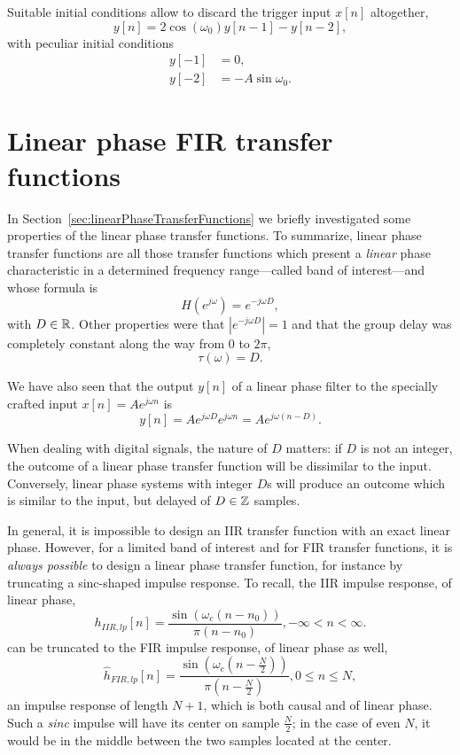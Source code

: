 \documentclass[\documentfontsize, twocolumn]{\classname}
\begin{document}
Suitable initial conditions allow to discard the trigger input $x[n]$ altogether,
\begin{equation}\label{eqn:sinusoidalDigitalOscillatorTriggerInitialConditionsFormula}
    y[n] = 2\cos{(\omega_0)}y[n-1] - y[n-2],
\end{equation}
with peculiar initial conditions
\begin{align}\label{eqn:sinusoidalDigitalOscillatorTriggerInitialConditions}
    y[-1] &= 0,\\
    y[-2] &= -A\sin{\omega_0}.
\end{align}


\chapter{Linear phase FIR transfer functions}
In Section~\ref{sec:linearPhaseTransferFunctions} we briefly investigated some properties of the linear phase transfer functions. To summarize, linear phase transfer functions are all those transfer functions which present a \emph{linear} phase characteristic in a determined frequency range---called band of interest---and whose formula is
\[
    H(e^{j\omega}) = e^{-j\omega D},
\]
with $D\in\mathbb R$. Other properties were that $\left|e^{-j\omega D}\right| = 1$ and that the group delay was completely constant along the way from $0$ to $2\pi$,
\[
    \tau(\omega) = D.
\]

We have also seen that the output $y[n]$ of a linear phase filter to the specially crafted input $x[n]=Ae^{j\omega n}$ is
\[
    y[n] = Ae^{j\omega D} e^{j\omega n} = Ae^{j\omega(n - D)}.
\]


When dealing with digital signals, the nature of $D$ matters: if $D$ is not an integer, the outcome of a linear phase transfer function will be dissimilar to the input. Conversely, linear phase systems with integer $D$s will produce an outcome which is similar to the input, but delayed of $D\in\mathbb Z$ samples.

In general, it is impossible to design an IIR transfer function with an exact linear phase. However, for a limited band of interest and for FIR transfer functions, it is \emph{always possible} to design a linear phase transfer function, for instance by truncating a sinc-shaped impulse response. To recall, the IIR impulse response, of linear phase,
\[
    h_{IIR,lp}[n] = \frac{
        \sin{(\omega_c(n - n_0))}
    } {
        \pi (n - n_0)
    }, -\infty < n < \infty.
\]
can be truncated to the FIR impulse response, of linear phase as well,
\[
    \hat{h}_{FIR,lp}[n] = \frac{
        \sin{(\omega_c(n - \frac N 2))}
    } {
        \pi (n - \frac N 2)
    }, 0 \leq n \leq N,
\]
an impulse response of length $N+1$, which is both causal and of linear phase. Such a \emph{sinc} impulse will have its center on sample $\frac N 2$; in the case of even $N$, it would be in the middle between the two samples located at the center.
\end{document}
